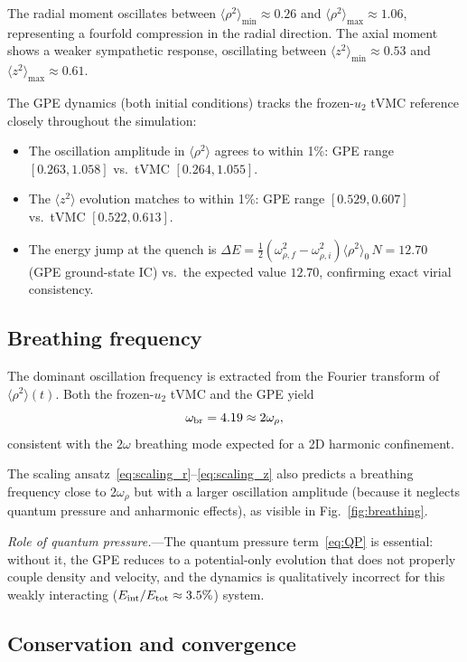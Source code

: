 \documentclass[twocolumn,superscriptaddress,aps,pra,longbibliography]{revtex4-2}
\newcommand{\avg}[1]{\langle #1 \rangle}
\begin{document}
The radial moment oscillates between $\avg{\rho^2}_{\min} \approx 0.26$
and $\avg{\rho^2}_{\max} \approx 1.06$, representing a fourfold
compression in the radial direction.  The axial moment shows a weaker
sympathetic response, oscillating between
$\avg{z^2}_{\min} \approx 0.53$ and $\avg{z^2}_{\max} \approx 0.61$.

The GPE dynamics (both initial conditions) tracks the frozen-$u_2$
tVMC reference closely throughout the simulation:
\begin{itemize}
\item The oscillation amplitude in $\avg{\rho^2}$ agrees to within 1\%:
GPE range $[0.263, 1.058]$ vs.\ tVMC $[0.264, 1.055]$.
\item The $\avg{z^2}$ evolution matches to within 1\%: GPE range
$[0.529, 0.607]$ vs.\ tVMC $[0.522, 0.613]$.
\item The energy jump at the quench is
$\Delta E = \frac{1}{2}(\omega_{\rho,f}^2 - \omega_{\rho,i}^2)
\avg{\rho^2}_0\,N = 12.70$ (GPE ground-state IC) vs.\ the expected
value $12.70$, confirming exact virial consistency.
\end{itemize}

\subsection{Breathing frequency}

The dominant oscillation frequency is extracted from the Fourier transform
of $\avg{\rho^2}(t)$.  Both the frozen-$u_2$ tVMC and the GPE yield
\begin{equation}
\omega_{\rm br} = 4.19 \approx 2\omega_\rho,
\label{eq:omega_br}
\end{equation}
consistent with the $2\omega$ breathing mode expected for a 2D
harmonic confinement.

The scaling ansatz~\eqref{eq:scaling_r}--\eqref{eq:scaling_z} also
predicts a breathing frequency close to $2\omega_\rho$ but with a
larger oscillation amplitude (because it neglects quantum pressure and
anharmonic effects), as visible in Fig.~\ref{fig:breathing}.

\emph{Role of quantum pressure.}---The quantum pressure
term~\eqref{eq:QP} is essential: without it, the GPE reduces to a
potential-only evolution that does not properly couple density and velocity,
and the dynamics is qualitatively incorrect for this weakly interacting
($E_{\rm int}/E_{\rm tot} \approx 3.5\%$) system.

\subsection{Conservation and convergence}
\label{sec:convergence}
\end{document}
